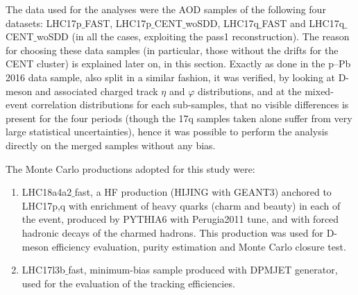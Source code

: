 The data used for the analyses were the AOD samples of the following four datasets: LHC17p$\_$FAST, LHC17p$\_$CENT$\_$woSDD, LHC17q$\_$FAST and LHC17q$\_$CENT$\_$woSDD (in all the cases, exploiting the pass1 reconstruction). The reason for choosing these data samples (in particular, those without the drifts for the CENT cluster) is explained later on, in this section. Exactly as done in the p--Pb 2016 data sample, also split in a similar fashion, it was verified, by looking at D-meson and associated charged track $\eta$ and $\varphi$ distributions, and at the mixed-event correlation distributions for each sub-samples, that no visible differences is present for the four periods (though the 17q samples taken alone suffer from very large statistical uncertainties), hence it was possible to perform the analysis directly on the merged samples without any bias.

The Monte Carlo productions adopted for this study were:
 \begin{enumerate}
 \item LHC18a4a2$\_$fast, a HF production (HIJING with GEANT3) anchored to LHC17p,q with enrichment of heavy quarks (charm and beauty) in each of the event, produced by PYTHIA6 with Perugia2011 tune, and with forced hadronic decays of the charmed hadrons. This production was used for D-meson efficiency evaluation, purity estimation and Monte Carlo closure test.
 \item LHC17l3b$\_$fast, minimum-bias sample produced with DPMJET generator, used for the evaluation of the tracking efficiencies.
\end{enumerate}

